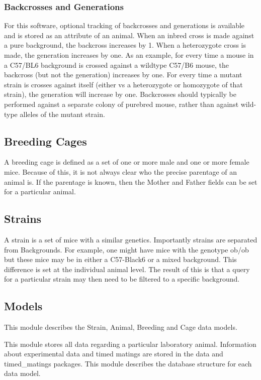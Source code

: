 \documentclass[letterpaper,10pt,english]{sphinxmanual}
\begin{document}
\subsubsection{Backcrosses and Generations}
\label{api:backcrosses-and-generations}
For this software, optional tracking of backcrosses and generations is available and is stored as an attribute of an animal.  When an inbred cross is made against a pure background, the backcross increases by 1.  When a heterozygote cross is made, the generation increases by one.  As an example, for every time a mouse in a C57/BL6 background is crossed against a wildtype C57/B6 mouse, the backcross (but not the generation) increases by one.  For every time a mutant strain is crosses against itself (either vs a heterozygote or homozygote of that strain), the generation will increase by one.  Backcrosses should typically be performed against a separate colony of purebred mouse, rather than against wild-type alleles of the mutant strain.


\subsection{Breeding Cages}
\label{api:breeding-cages}
A breeding cage is defined as a set of one or more male and one or more female mice.  Because of this, it is not always clear who the precise parentage of an animal is.  If the parentage is known, then the Mother and Father fields can be set for a particular animal.


\subsection{Strains}
\label{api:strains}
A strain is a set of mice with a similar genetics.  Importantly strains are separated from Backgrounds.  For example, one might have mice with the genotype ob/ob but these mice may be in either a C57-Black6 or a mixed background.  This difference is set at the individual animal level.  
The result of this is that a query for a particular strain may then need to be filtered to a specific background.


\subsection{Models}
\label{api:id1}\label{api:module-animal.models}
This module describes the Strain, Animal, Breeding and Cage data models.

This module stores all data regarding a particular laboratory animal.  Information about experimental data and timed matings are stored in the data and timed\_matings packages.  This module describes the database structure for each data model.
\end{document}

